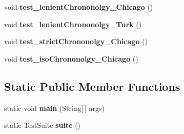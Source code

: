 \begin{DoxyCompactItemize}
\item 
\hypertarget{classorg_1_1joda_1_1time_1_1chrono_1_1_test_lenient_chronology_ae1b8b150ea6d95fb8880656f7114ca36}{void {\bfseries test\-\_\-lenient\-Chrononolgy\-\_\-\-Chicago} ()}\label{classorg_1_1joda_1_1time_1_1chrono_1_1_test_lenient_chronology_ae1b8b150ea6d95fb8880656f7114ca36}

\item 
\hypertarget{classorg_1_1joda_1_1time_1_1chrono_1_1_test_lenient_chronology_ade03cc7df0b4261f697253f7443f55f6}{void {\bfseries test\-\_\-lenient\-Chrononolgy\-\_\-\-Turk} ()}\label{classorg_1_1joda_1_1time_1_1chrono_1_1_test_lenient_chronology_ade03cc7df0b4261f697253f7443f55f6}

\item 
\hypertarget{classorg_1_1joda_1_1time_1_1chrono_1_1_test_lenient_chronology_a0a69d4e81e14d8afb383827e8ec33cbd}{void {\bfseries test\-\_\-strict\-Chrononolgy\-\_\-\-Chicago} ()}\label{classorg_1_1joda_1_1time_1_1chrono_1_1_test_lenient_chronology_a0a69d4e81e14d8afb383827e8ec33cbd}

\item 
\hypertarget{classorg_1_1joda_1_1time_1_1chrono_1_1_test_lenient_chronology_af3755206e73111ef63217123548ea7f2}{void {\bfseries test\-\_\-iso\-Chrononolgy\-\_\-\-Chicago} ()}\label{classorg_1_1joda_1_1time_1_1chrono_1_1_test_lenient_chronology_af3755206e73111ef63217123548ea7f2}

\end{DoxyCompactItemize}
\subsection*{Static Public Member Functions}
\begin{DoxyCompactItemize}
\item 
\hypertarget{classorg_1_1joda_1_1time_1_1chrono_1_1_test_lenient_chronology_a79a4e004558c21d98898caed9391c94d}{static void {\bfseries main} (String\mbox{[}$\,$\mbox{]} args)}\label{classorg_1_1joda_1_1time_1_1chrono_1_1_test_lenient_chronology_a79a4e004558c21d98898caed9391c94d}

\item 
\hypertarget{classorg_1_1joda_1_1time_1_1chrono_1_1_test_lenient_chronology_adf6c456206b8d4c5bea7a6bac041a7d7}{static Test\-Suite {\bfseries suite} ()}\label{classorg_1_1joda_1_1time_1_1chrono_1_1_test_lenient_chronology_adf6c456206b8d4c5bea7a6bac041a7d7}

\end{DoxyCompactItemize}
